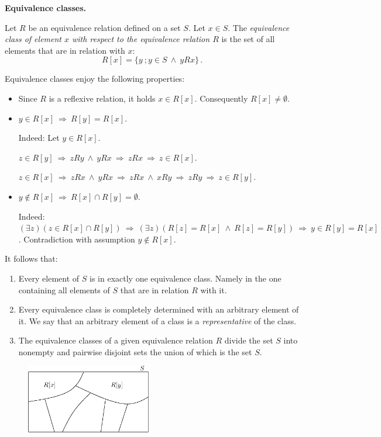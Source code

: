 \documentclass[11pt,paper=b5,footinclude,headinclude]{scrbook} %
\def\inn {{~\wedge~}}
\def\sledi {{~\Rightarrow~}}
\theoremstyle{remark}
\theoremstyle{definition} %
\theoremstyle{theorem} %
\begin{document}
\medskip
\textbf{ Equivalence classes.}

Let $R$ be an equivalence relation defined on a set $S$. Let $x\in S$. The {\em equivalence class of element $x$ with respect to the equivalence relation $R$} is the set of all elements that are in relation with $x$:
$$R[x] = \{y~;y\in S \inn yRx\}\,.$$

Equivalence classes enjoy the following properties:
\begin{itemize}
  \item Since $R$ is a reflexive relation, it holds $x\in R[x]$. Consequently $R[x]\neq \emptyset$.
  \item $y\in R[x]\sledi R[y]=R[x]$.

  Indeed: Let $y\in R[x]$.

  $z\in R[y]\sledi zRy\inn yRx\sledi zRx\sledi z\in R[x]$.

  $z\in R[x]\sledi zRx\inn yRx\sledi zRx\inn xRy \sledi zRy\sledi z\in R[y]$.
  \item $y\not\in R[x]\sledi R[x]\cap R[y]=\emptyset$.

  Indeed: $(\exists z)(z\in R[x]\cap R[y])\sledi (\exists z)(R[z] = R[x]\inn R[z] = R[y])\sledi
  y\in R[y]=R[x]$. Contradiction with assumption $y\not\in R[x]$.
  \end{itemize}

It follows that:
\begin{enumerate}
  \item Every element of $S$ is in exactly one equivalence class. Namely in the one containing all elements of $S$ that are in relation $R$ with it.
  \item Every equivalence class is completely determined with an arbitrary element of it. We say that an arbitrary element of a class is a {\em representative} of the class.
      \item The equivalence classes of a given equivalence relation $R$ divide the set $S$ into
      nonempty and pairwise disjoint sets the union of which is the set $S$.
      \end{enumerate}

\begin{figure}[htp]
\begin{center}
\includegraphics[height=30mm]{ekvivalencna.eps}
\end{center}
\end{figure}
\end{document}
